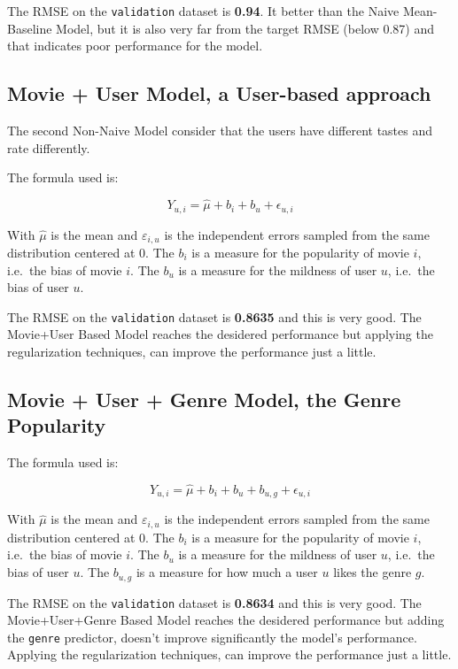 \documentclass[
]{article}
\begin{document}
The RMSE on the \texttt{validation} dataset is \textbf{0.94}. It better
than the Naive Mean-Baseline Model, but it is also very far from the
target RMSE (below 0.87) and that indicates poor performance for the
model.

\hypertarget{movie-user-model-a-user-based-approach}{%
\subsection{Movie + User Model, a User-based
approach}\label{movie-user-model-a-user-based-approach}}

The second Non-Naive Model consider that the users have different tastes
and rate differently.

The formula used is:

\[Y_{u,i} = \hat{\mu} + b_i + b_u + \epsilon_{u,i}\]

With \(\hat{\mu}\) is the mean and \(\varepsilon_{i,u}\) is the
independent errors sampled from the same distribution centered at 0. The
\(b_i\) is a measure for the popularity of movie \(i\), i.e.~the bias of
movie \(i\). The \(b_u\) is a measure for the mildness of user \(u\),
i.e.~the bias of user \(u\).

The RMSE on the \texttt{validation} dataset is \textbf{0.8635} and this
is very good. The Movie+User Based Model reaches the desidered
performance but applying the regularization techniques, can improve the
performance just a little.

\hypertarget{movie-user-genre-model-the-genre-popularity}{%
\subsection{Movie + User + Genre Model, the Genre
Popularity}\label{movie-user-genre-model-the-genre-popularity}}

The formula used is:

\[Y_{u,i} = \hat{\mu} + b_i + b_u + b_{u,g} + \epsilon_{u,i}\]

With \(\hat{\mu}\) is the mean and \(\varepsilon_{i,u}\) is the
independent errors sampled from the same distribution centered at 0. The
\(b_i\) is a measure for the popularity of movie \(i\), i.e.~the bias of
movie \(i\). The \(b_u\) is a measure for the mildness of user \(u\),
i.e.~the bias of user \(u\). The \(b_{u,g}\) is a measure for how much a
user \(u\) likes the genre \(g\).

The RMSE on the \texttt{validation} dataset is \textbf{0.8634} and this
is very good. The Movie+User+Genre Based Model reaches the desidered
performance but adding the \texttt{genre} predictor, doesn't improve
significantly the model's performance. Applying the regularization
techniques, can improve the performance just a little.
\end{document}
